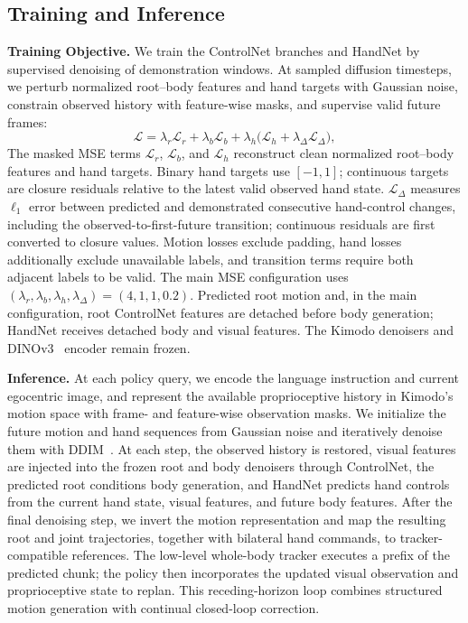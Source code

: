 \subsection{Training and Inference}
\label{sec:training_inference}

\textbf{Training Objective.} We train the ControlNet branches and HandNet by supervised denoising of demonstration windows. At sampled diffusion timesteps, we perturb normalized root--body features and hand targets with Gaussian noise, constrain observed history with feature-wise masks, and supervise valid future frames:
\begin{equation}
  \mathcal{L}=\lambda_r\mathcal{L}_{r}+\lambda_b\mathcal{L}_{b}
  +\lambda_h\bigl(\mathcal{L}_{h}+\lambda_{\Delta}\mathcal{L}_{\Delta}\bigr),
  \label{eq:policy_training_objective}
\end{equation}
The masked MSE terms $\mathcal{L}_{r}$, $\mathcal{L}_{b}$, and $\mathcal{L}_{h}$ reconstruct clean normalized root--body features and hand targets. Binary hand targets use $[-1,1]$; continuous targets are closure residuals relative to the latest valid observed hand state. $\mathcal{L}_{\Delta}$ measures $\ell_1$ error between predicted and demonstrated consecutive hand-control changes, including the observed-to-first-future transition; continuous residuals are first converted to closure values. Motion losses exclude padding, hand losses additionally exclude unavailable labels, and transition terms require both adjacent labels to be valid. The main MSE configuration uses $(\lambda_r,\lambda_b,\lambda_h,\lambda_{\Delta})=(4,1,1,0.2)$. Predicted root motion and, in the main configuration, root ControlNet features are detached before body generation; HandNet receives detached body and visual features. The Kimodo denoisers and DINOv3~\cite{dinov3} encoder remain frozen.

\textbf{Inference.} At each policy query, we encode the language instruction and current egocentric image, and represent the available proprioceptive history in Kimodo's motion space with frame- and feature-wise observation masks. We initialize the future motion and hand sequences from Gaussian noise and iteratively denoise them with DDIM~\cite{song2022denoisingdiffusionimplicitmodels}. At each step, the observed history is restored, visual features are injected into the frozen root and body denoisers through ControlNet, the predicted root conditions body generation, and HandNet predicts hand controls from the current hand state, visual features, and future body features. After the final denoising step, we invert the motion representation and map the resulting root and joint trajectories, together with bilateral hand commands, to tracker-compatible references. The low-level whole-body tracker executes a prefix of the predicted chunk; the policy then incorporates the updated visual observation and proprioceptive state to replan. This receding-horizon loop combines structured motion generation with continual closed-loop correction.
